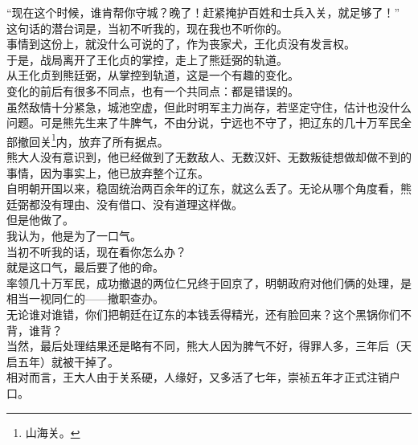 \begin{multicols}{\theparacolNo}
“现在这个时候，谁肯帮你守城？晚了！赶紧掩护百姓和士兵入关，就足够了！”\\

这句话的潜台词是，当初不听我的，现在我也不听你的。\\

事情到这份上，就没什么可说的了，作为丧家犬，王化贞没有发言权。\\

于是，战局离开了王化贞的掌控，走上了熊廷弼的轨道。\\

从王化贞到熊廷弼，从掌控到轨道，这是一个有趣的变化。\\

变化的前后有很多不同点，也有一个共同点：都是错误的。\\

虽然敌情十分紧急，城池空虚，但此时明军主力尚存，若坚定守住，估计也没什么问题。可是熊先生来了牛脾气，不由分说，宁远也不守了，把辽东的几十万军民全部撤回关\footnote{山海关。}内，放弃了所有据点。\\

熊大人没有意识到，他已经做到了无数敌人、无数汉奸、无数叛徒想做却做不到的事情，因为事实上，他已放弃整个辽东。\\

自明朝开国以来，稳固统治两百余年的辽东，就这么丢了。无论从哪个角度看，熊廷弼都没有理由、没有借口、没有道理这样做。\\

但是他做了。\\

我认为，他是为了一口气。\\

当初不听我的话，现在看你怎么办？\\

就是这口气，最后要了他的命。\\

率领几十万军民，成功撤退的两位仁兄终于回京了，明朝政府对他们俩的处理，是相当一视同仁的——撤职查办。\\

无论谁对谁错，你们把朝廷在辽东的本钱丢得精光，还有脸回来？这个黑锅你们不背，谁背？\\

当然，最后处理结果还是略有不同，熊大人因为脾气不好，得罪人多，三年后（天启五年）就被干掉了。\\

相对而言，王大人由于关系硬，人缘好，又多活了七年，崇祯五年才正式注销户口。\\


\end{multicols}
